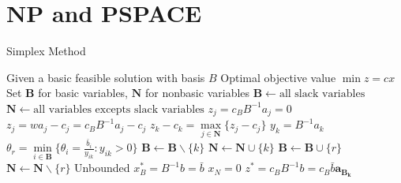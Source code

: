 	\chapter{NP and PSPACE}


				\begin{algorithm}[h!]
					\caption{Simplex Method}
					\begin{algorithmic}[1]
						\REQUIRE Given a basic feasible solution with basis $B$
						\ENSURE Optimal objective value $\min z= cx$
						\STATE Set $\mathbf{B}$ for basic variables, $\mathbf{N}$ for nonbasic variables
						\STATE $\mathbf{B} \gets \text{all slack variables}$
						\STATE $\mathbf{N} \gets \text{all variables excepts slack variables}$
							\STATE $z_j=c_BB^{-1}a_j=0$
						\ENDFOR
							\STATE $z_j=wa_j-c_j=c_BB^{-1}a_j-c_j$
							\STATE $z_k-c_k=\max\limits_{j \in \mathbf{N}}\{z_j-c_j\}$
							\STATE $y_k=B^{-1}a_k$
								\STATE $\theta_r=\min\limits_{i \in \mathbf{B}}\{\theta_i=\frac{\bar{b}_i}{y_{ik}}:y_{ik}>0\}$
								\STATE $\mathbf{B} \gets \mathbf{B} \backslash \{k\}$
								\STATE $\mathbf{N} \gets \mathbf{N} \cup \{k\}$
								\STATE $\mathbf{B} \gets \mathbf{B} \cup \{r\}$
								\STATE $\mathbf{N} \gets \mathbf{N} \backslash \{r\}$
							\ELSE
								\STATE Unbounded
							\ENDIF
						\ENDWHILE
						\STATE $x_B^*=B^{-1}b=\bar{b}$
						\STATE $x_N=0$
						\STATE $z^*=c_BB^{-1}b=c_B\bar{b}\mathbf{a_{B_k}}$
					\end{algorithmic}
				\end{algorithm}